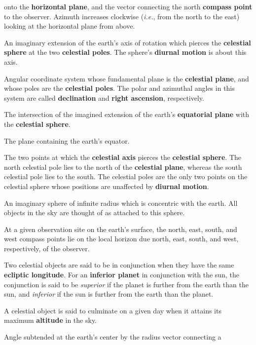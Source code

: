 {\begin{description}
onto the {\bf horizontal plane}, and the vector connecting the
north {\bf compass point}\/ to the observer. Azimuth increases clockwise ({\em i.e.}, from the north to the east) looking at the
horizontal plane from above.
\item[Celestial Axis:] An imaginary extension of the earth's axis
of rotation which pierces the {\bf celestial sphere}\/ at the two
{\bf celestial poles}. The sphere's {\bf diurnal motion}\/ is about this
axis.
\item [Celestial Coordinates:] Angular coordinate system whose fundamental
plane is the
{\bf celestial plane}, and whose poles are the {\bf celestial poles}. 
The polar and azimuthal angles in this system are called {\bf declination}\/ and {\bf right ascension}, respectively.
\item[Celestial Equator:] The intersection of the imagined extension
of the earth's {\bf equatorial plane}\/ with the {\bf celestial sphere}.
\item[Celestial Plane:] The plane containing the earth's equator.
\item [Celestial Poles:] The two points at which the {\bf celestial axis}\/
pierces the {\bf celestial sphere}. The north celestial pole lies to the
north of the {\bf celestial plane}, whereas the south celestial pole lies to the south. The celestial poles are the only two
points on the celestial sphere whose positions are unaffected
by {\bf diurnal motion}.
\item[Celestial Sphere:]  An imaginary sphere of infinite radius which is concentric with the earth. All objects in the sky are thought of as attached to this sphere.
\item[Compass Points:] At a given observation site on the earth's surface, the north, east, south, and west compass points
lie on the local horizon due north, east, south, and west, respectively, of the
 observer.
 \item[Conjunction:] Two celestial objects are said to be in  conjunction when they
 have the same {\bf ecliptic longitude}. For an {\bf inferior planet}\/ in conjunction with the sun, 
 the conjunction is said to be {\em superior}\/ if the planet is further from the earth
 than the sun, and {\em inferior}\/ if the sun is further from the earth
 than the planet. 
\item [Culmination:] A celestial object is said to culminate on a given day when it attains its
maximum {\bf altitude}\/ in the sky. 
\item[Declination:] Angle subtended at the earth's center by the radius vector connecting a

\end{description}}
